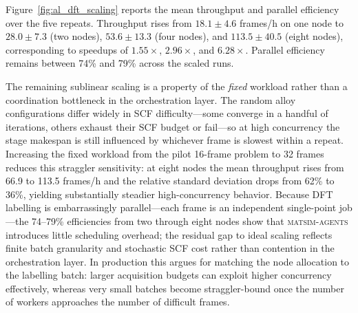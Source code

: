 \documentclass[conference]{IEEEtran}
\def\acs#1{#1}%
\begin{document}
Figure~\ref{fig:al_dft_scaling} reports the mean throughput and parallel
efficiency over the five repeats. Throughput rises from $18.1\pm4.6$ frames/h on
one node to $28.0\pm7.3$ (two nodes), $53.6\pm13.3$ (four nodes), and
$113.5\pm40.5$ (eight nodes), corresponding to speedups of $1.55\times$,
$2.96\times$, and $6.28\times$. Parallel efficiency remains between 74\% and
79\% across the scaled runs.

The remaining sublinear scaling is a property of the \emph{fixed} workload
rather than a coordination bottleneck in the orchestration layer. The random
alloy configurations differ widely in \acs{SCF} difficulty---some converge in a
handful of iterations, others exhaust their \acs{SCF} budget or fail---so at high
concurrency the stage makespan is still influenced by whichever frame is slowest
within a repeat. Increasing the fixed workload from the pilot 16-frame problem to
32 frames reduces this straggler sensitivity: at eight nodes the mean throughput
rises from 66.9 to 113.5 frames/h and the relative standard deviation drops from
62\% to 36\%, yielding substantially steadier high-concurrency behavior. Because
\acs{DFT} labelling is embarrassingly parallel---each frame is an independent
single-point job---the 74--79\% efficiencies from two through eight nodes show
that \textsc{matsim-agents} introduces little scheduling overhead; the residual
gap to ideal scaling reflects finite batch granularity and stochastic \acs{SCF}
cost rather than contention in the orchestration layer. In production this
argues for matching the node allocation to the labelling batch: larger
acquisition budgets can exploit higher concurrency effectively, whereas very
small batches become straggler-bound once the number of workers approaches the
number of difficult frames.
\end{document}
